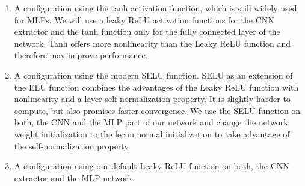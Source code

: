\begin{enumerate}
    \item A configuration using the tanh activation function, which is still widely used for MLPs. We will use a leaky ReLU activation functions for the CNN extractor and the tanh function only for the fully connected layer of the network. Tanh offers more nonlinearity than the Leaky ReLU function and therefore may improve performance.
    \item A configuration using the modern SELU function. SELU as an extension of the ELU function combines the advantages of the Leaky ReLU function with nonlinearity and a layer self-normalization property. It is slightly harder to compute, but also promises faster convergence. We use the SELU function on both, the CNN and the MLP part of our network and change the network weight initialization to the lecun normal initialization to take advantage of the self-normalization property.
    \item A configuration using our default Leaky ReLU function on both, the CNN extractor and the MLP network.
\end{enumerate}

